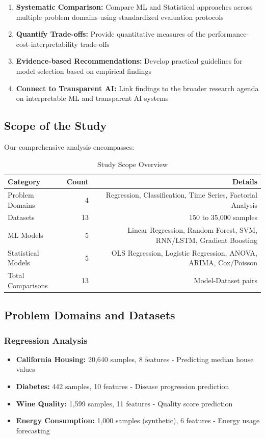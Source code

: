 \documentclass[11pt,a4paper]{article}
\begin{document}
\begin{enumerate}
    \item \textbf{Systematic Comparison:} Compare ML and Statistical approaches across multiple problem domains using standardized evaluation protocols
    \item \textbf{Quantify Trade-offs:} Provide quantitative measures of the performance-cost-interpretability trade-offs
    \item \textbf{Evidence-based Recommendations:} Develop practical guidelines for model selection based on empirical findings
    \item \textbf{Connect to Transparent AI:} Link findings to the broader research agenda on interpretable ML and transparent AI systems
\end{enumerate}

\subsection{Scope of the Study}

Our comprehensive analysis encompasses:

\begin{table}[h]
\centering
\begin{tabular}{lrr}
\toprule
\textbf{Category} & \textbf{Count} & \textbf{Details} \\
\midrule
Problem Domains & 4 & Regression, Classification, Time Series, Factorial Analysis \\
Datasets & 13 & 150 to 35,000 samples \\
ML Models & 5 & Linear Regression, Random Forest, SVM, RNN/LSTM, Gradient Boosting \\
Statistical Models & 5 & OLS Regression, Logistic Regression, ANOVA, ARIMA, Cox/Poisson \\
Total Comparisons & 13 & Model-Dataset pairs \\
\bottomrule
\end{tabular}
\caption{Study Scope Overview}
\label{tab:scope}
\end{table}

\subsection{Problem Domains and Datasets}

\subsubsection{Regression Analysis}
\begin{itemize}
    \item \textbf{California Housing:} 20,640 samples, 8 features - Predicting median house values
    \item \textbf{Diabetes:} 442 samples, 10 features - Disease progression prediction
    \item \textbf{Wine Quality:} 1,599 samples, 11 features - Quality score prediction
    \item \textbf{Energy Consumption:} 1,000 samples (synthetic), 6 features - Energy usage forecasting
\end{itemize}
\end{document}
